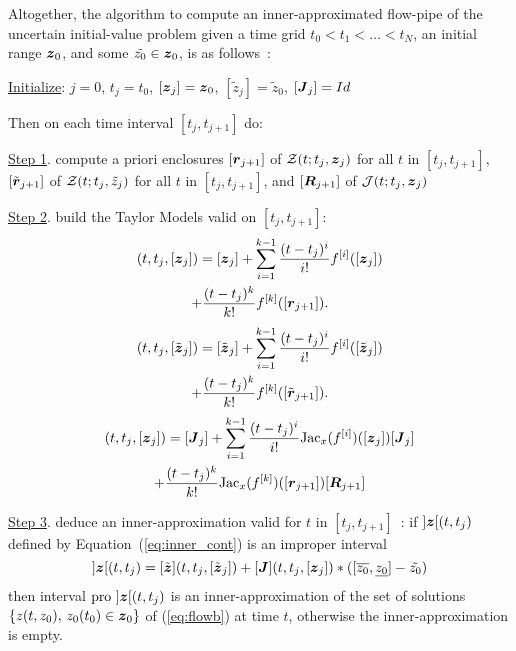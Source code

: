 \documentclass{sig-alternate-05-2015} %
\newcommand{\pro}{\mbox{pro }}
\begin{document}
Altogether, the algorithm to compute an inner-approxima\-ted flow-pipe of the uncertain initial-value problem given a time grid  $t_0 < t_1 < \ldots < t_N$, 
an initial range $\z_0$, and some $\tilde{z_0} \in \z_0$, is as follows~:
 {\par\smallskip                     %
  \begin{center}%
   \fbox%
   {\parbox{1.\linewidth}%
    { %
\underline{Initialize}: $j=0$, $t_j=t_0$, $[\z_j]=\z_0$, $[\tilde{z}_j]=\tilde{z}_0$, $[\J_j] = Id$

Then on each time interval $[t_j,t_{j+1}]$ do:

\underline{Step 1}. compute a priori enclosures $[\r_{j+1}]$  of  ${\cal Z}(t;t_j,\z_j)$ for all $t$ in $[t_j,t_{j+1}]$, $[\tilde{\r}_{j+1}]$  of  ${\cal Z}(t;t_j,\tilde{z}_j)$ for all $t$ in $[t_j,t_{j+1}]$,
and $[\bfm{R}_{j+1}]$ of ${\cal J}(t;t_j,\z_j)$

\underline{Step 2}. build the Taylor Models valid on $[t_j,t_{j+1}]$:
\begin{multline}
[\z](t,t_j,[{\z}_j]) = [{\z}_j] + \sum\limits_{i=1}^{k-1} \frac{(t-t_j)^i}{i !} f^{[i]}([{\z}_j])\\+ 
\frac{(t-t_j)^k}{k !} f^{[k]}([{\r}_{j+1}]).
\label{eq:TM1}
\end{multline}
\begin{multline}
[\tilde{\z}](t,t_j,[\tilde{\z}_j]) = [\tilde{\z}_j] + \sum\limits_{i=1}^{k-1} \frac{(t-t_j)^i}{i !} f^{[i]}([\tilde{\z}_j])\\+ \frac{(t-t_j)^k}{k !} f^{[k]}([\tilde{\r}_{j+1}]).
\label{eq:TM2}
\end{multline}
\begin{multline}
[\J](t,t_j,[{\z}_j]) = [{\J}_j] + \sum\limits_{i=1}^{k-1} \frac{(t-t_j)^i}{i !} \mbox{Jac}_x(f^{[i]})([{\z}_{j}]) [{\J}_j] \\ +  \frac{(t-t_j)^k}{k !} \mbox{Jac}_x(f^{[k]})([{\r}_{j+1}]) [\bfm{R}_{j+1}]
\label{eq:TM3}
\end{multline}

\underline{Step 3}. deduce an inner-approximation valid for $t$ in $[t_j,t_{j+1}]$~: if $]\z[(t,t_j)$ defined by Equation~(\ref{eq:inner_cont}) is an improper interval\\
\begin{equation} 
]\z[(t,t_j) = [\tilde{\z}](t,t_j,[\tilde{\z}_j]) + [\J](t,t_j,[{\z}_j])*([\overline{z_0},\underline{z_0}]-\tilde{z_0}) 
\label{eq:inner_cont}
\end{equation}
\noindent 
then interval $\pro]\z[(t,t_j)$ is an inner-approximation of  the set of solutions $\{ z(t,z_0), \, z_0(t_0) \in \z_0 \}$ of  (\ref{eq:flowb}) at time $t$,
otherwise the inner-approximation is empty.\\

}}
\end{center}}
\end{document}
